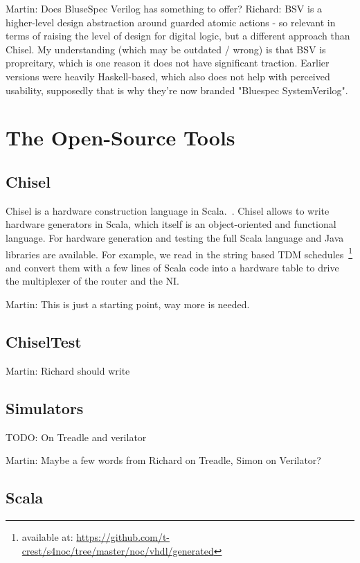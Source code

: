 \documentclass[a4paper, conference]{IEEEtran}
\newcommand{\todo}[1]{{\color{olive} TODO: #1}}
\newcommand{\martin}[1]{{\color{blue} Martin: #1}}
\newcommand{\ducky}[1]{{\color{orange} Richard: #1}}
\begin{document}
\martin{Does BluseSpec Verilog has something to offer?}
\ducky{BSV is a higher-level design abstraction around guarded atomic actions - so relevant in terms of raising the level of design for digital logic, but a different approach than Chisel. My understanding (which may be outdated / wrong) is that BSV is propreitary, which is one reason it does not have significant traction. Earlier versions were heavily Haskell-based, which also does not help with perceived usability, supposedly that is why they're now branded "Bluespec SystemVerilog".}

\section{The Open-Source Tools}

\subsection{Chisel}

Chisel is a hardware construction language in Scala.~\cite{chisel:dac2012}.
Chisel allows to write hardware generators
in Scala, which itself is an object-oriented and functional language.
For hardware generation and testing the full Scala language and Java
libraries are available. For example, we read in the string based TDM
schedules~\footnote{available at: \url{https://github.com/t-crest/s4noc/tree/master/noc/vhdl/generated}}
and convert them with a few lines of Scala code into a hardware table to
drive the multiplexer of the router and the NI.

\martin{This is just a starting point, way more is needed.}

\subsection{ChiselTest}

\martin{Richard should write}

\subsection{Simulators}

\todo{On Treadle and verilator}

\martin{Maybe a few words from Richard on Treadle, Simon on Verilator?}



\subsection{Scala}
\end{document}
